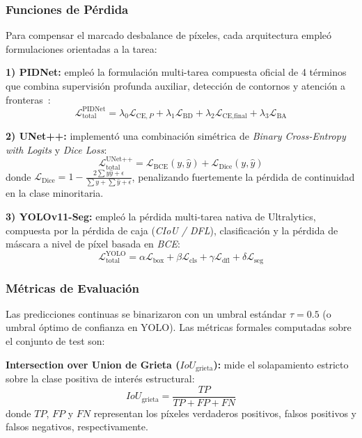 \documentclass[conference]{IEEEtran}
\begin{document}
\subsubsection{Funciones de Pérdida}
Para compensar el marcado desbalance de píxeles, cada arquitectura empleó formulaciones orientadas a la tarea:

\textbf{1) PIDNet:} empleó la formulación multi-tarea compuesta oficial de 4 términos que combina supervisión profunda auxiliar, detección de contornos y atención a fronteras~\cite{xu2023pidnet}:
\begin{equation}
\mathcal{L}_{\text{total}}^{\text{PIDNet}} = \lambda_0 \mathcal{L}_{\text{CE}, P} + \lambda_1 \mathcal{L}_{\text{BD}} + \lambda_2 \mathcal{L}_{\text{CE}, \text{final}} + \lambda_3 \mathcal{L}_{\text{BA}}
\label{eq:pidnet_loss}
\end{equation}

\textbf{2) UNet++:} implementó una combinación simétrica de \textit{Binary Cross-Entropy with Logits} y \textit{Dice Loss}:
\begin{equation}
\mathcal{L}_{\text{total}}^{\text{UNet++}} = \mathcal{L}_{\text{BCE}}(y, \hat{y}) + \mathcal{L}_{\text{Dice}}(y, \hat{y})
\label{eq:unet_loss}
\end{equation}
donde $\mathcal{L}_{\text{Dice}} = 1 - \frac{2 \sum y \hat{y} + \epsilon}{\sum y + \sum \hat{y} + \epsilon}$, penalizando fuertemente la pérdida de continuidad en la clase minoritaria.

\textbf{3) YOLOv11-Seg:} empleó la pérdida multi-tarea nativa de Ultralytics, compuesta por la pérdida de caja (\textit{CIoU / DFL}), clasificación y la pérdida de máscara a nivel de píxel basada en \textit{BCE}:
\begin{equation}
\mathcal{L}_{\text{total}}^{\text{YOLO}} = \alpha \mathcal{L}_{\text{box}} + \beta \mathcal{L}_{\text{cls}} + \gamma \mathcal{L}_{\text{dfl}} + \delta \mathcal{L}_{\text{seg}}
\label{eq:yolo_loss}
\end{equation}

\subsubsection{Métricas de Evaluación}
Las predicciones continuas se binarizaron con un umbral estándar $\tau = 0.5$ (o umbral óptimo de confianza en YOLO). Las métricas formales computadas sobre el conjunto de test son:

\textbf{Intersection over Union de Grieta ($IoU_{\text{grieta}}$):} mide el solapamiento estricto sobre la clase positiva de interés estructural:
\begin{equation}
IoU_{\text{grieta}} = \frac{TP}{TP + FP + FN}
\label{eq:iou_crack}
\end{equation}
donde $TP$, $FP$ y $FN$ representan los píxeles verdaderos positivos, falsos positivos y falsos negativos, respectivamente.
\end{document}
